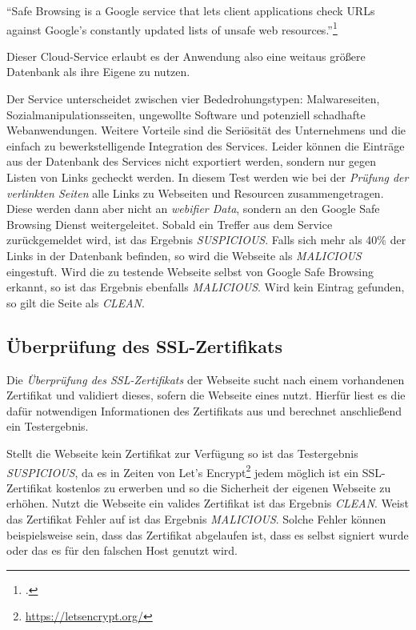 \begin{center}
	\enquote{Safe Browsing is a Google service that lets client applications check \acsp{URL} against
	Google's constantly updated lists of unsafe web resources.}\footcite[Vgl.][]{googleSafeBrowsing}
\end{center}

Dieser Cloud-Service erlaubt es der Anwendung also eine weitaus größere Datenbank als ihre Eigene zu
nutzen.

Der Service unterscheidet zwischen vier Bededrohungstypen\label{par:konzep-gsb-types}: Malwareseiten, Sozialmanipulationsseiten, ungewollte Software und potenziell schadhafte Webanwendungen.
Weitere Vorteile sind die Seriösität des Unternehmens und die einfach zu bewerkstelligende
Integration des Services.
Leider können die Einträge aus der Datenbank des Services nicht exportiert werden, sondern nur gegen Listen von Links gecheckt werden.
In diesem Test werden wie bei der \textit{Prüfung der verlinkten Seiten} alle Links zu Webseiten und
Resourcen zusammengetragen.
Diese werden dann aber nicht an \textit{webifier Data}, sondern an den Google Safe Browsing Dienst
weitergeleitet.
Sobald ein Treffer aus dem Service zurückgemeldet wird, ist das Ergebnis \textit{SUSPICIOUS}.
Falls sich mehr als 40\% der Links in der Datenbank befinden, so wird die Webseite als
\textit{MALICIOUS} eingestuft.
Wird die zu testende Webseite selbst von Google Safe Browsing erkannt, so ist das Ergebnis ebenfalls
\textit{MALICIOUS}.
Wird kein Eintrag gefunden, so gilt die Seite als \textit{CLEAN}.

\subsection{Überprüfung des SSL-Zertifikats}

Die \textit{Überprüfung des SSL-Zertifikats} der Webseite sucht nach einem vorhandenen Zertifikat
und validiert dieses, sofern die Webseite eines nutzt. Hierfür liest es die dafür notwendigen
Informationen des Zertifikats aus und berechnet anschließend ein Testergebnis.

Stellt die Webseite kein Zertifikat zur Verfügung so ist das Testergebnis \textit{SUSPICIOUS}, da
es in Zeiten von Let's Encrypt\footnote{\url{https://letsencrypt.org/}} jedem möglich ist ein
\acs{SSL}-Zertifikat kostenlos zu erwerben und so die Sicherheit der eigenen Webseite zu erhöhen.
Nutzt die Webseite ein valides Zertifikat ist das Ergebnis \textit{CLEAN}. Weist das Zertifikat
Fehler auf ist das Ergebnis \textit{MALICIOUS}. Solche Fehler können beispielsweise sein, dass das
Zertifikat abgelaufen ist, dass es selbst signiert wurde oder das es für den falschen Host genutzt
wird.

